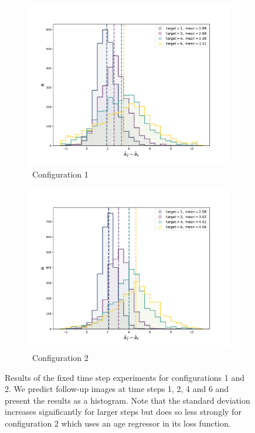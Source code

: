 \begin{figure}[h]
	\centering
	\begin{subfigure}{0.9\textwidth}
		\includegraphics[width=\linewidth, trim={0 20 0 20}, clip]{images/age_plots/hist_fixed_config1} 
		\caption{\ Configuration 1}
	\end{subfigure}
	\begin{subfigure}{0.9\textwidth}
		\includegraphics[width=\linewidth, trim={0 20 0 20}, clip]{images/age_plots/hist_fixed_config2}
		\caption{\ Configuration 2}
	\end{subfigure}
	 
	\caption{Results of the fixed time step experiments for configurations 1 and 2. We predict follow-up images at time steps 1, 2, 4 and 6 and present the results as a histogram. Note that the standard deviation increases significantly for larger steps but does so less strongly for configuration 2 which uses an age regressor in its loss function.}
	\label{fig:expfixedhist}
\end{figure}

